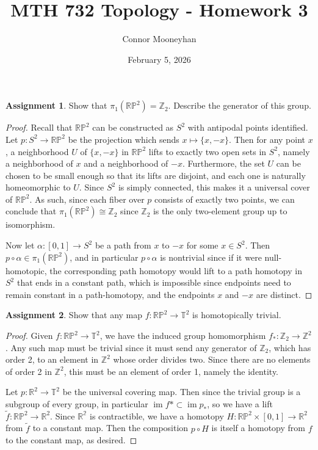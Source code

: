 \documentclass[12pt]{article}
\title{MTH 732 Topology - Homework 3}
\author{Connor Mooneyhan}
\date{February 5, 2026}
\DeclareMathOperator{\im}{im}
\theoremstyle{definition}
\newtheorem{ex}{Assignment}
\begin{document}
\maketitle

\begin{ex}
	Show that $\pi_1(\mathbb{RP}^2) = \mathbb{Z}_2$.
	Describe the generator of this group.
\end{ex}
\begin{proof}
	Recall that $\mathbb{RP}^2$ can be constructed as $S^2$ with antipodal points identified.
	Let $p: S^2 \to \mathbb{RP}^2$ be the projection which sends $x \mapsto \lbrace x, -x \rbrace$.
	Then for any point $x$, a neighborhood $U$ of $\lbrace x, -x \rbrace$ in $\mathbb{RP}^2$ lifts to exactly two open sets in $S^2$, namely a neighborhood of $x$ and a neighborhood of $-x$.
	Furthermore, the set $U$ can be chosen to be small enough so that its lifts are disjoint, and each one is naturally homeomorphic to $U$.
	Since $S^2$ is simply connected, this makes it a universal cover of $\mathbb{RP}^2$.
	As such, since each fiber over $p$ consists of exactly two points, we can conclude that $\pi_1(\mathbb{RP}^2) \cong \mathbb{Z}_2$ since $\mathbb{Z}_2$ is the only two-element group up to isomorphism.

	Now let $\alpha : [0, 1] \to S^2$ be a path from $x$ to $-x$ for some $x \in S^2$.
	Then $p \circ \alpha \in \pi_1(\mathbb{RP}^2)$, and in particular $p \circ \alpha$ is nontrivial since if it were null-homotopic, the corresponding path homotopy would lift to a path homotopy in $S^2$ that ends in a constant path, which is impossible since endpoints need to remain constant in a path-homotopy, and the endpoints $x$ and $-x$ are distinct.
\end{proof}

\begin{ex}
	Show that any map $f : \mathbb{R}\mathbb{P}^2 \to \mathbb{T}^2$ is homotopically trivial.
\end{ex}
\begin{proof}
	Given $f : \mathbb{RP}^2 \to \mathbb{T}^2$, we have the induced group homomorphism $f_* : \mathbb{Z}_2 \to \mathbb{Z}^2$.
	Any such map must be trivial since it must send any generator of $\mathbb{Z}_2$, which has order 2, to an element in $\mathbb{Z}^2$ whose order divides two.
	Since there are no elements of order 2 in $\mathbb{Z}^2$, this must be an element of order 1, namely the identity.

	Let $p : \mathbb{R}^2 \to \mathbb{T}^2$ be the universal covering map.
	Then since the trivial group is a subgroup of every group, in particular $\im f* \subset \im p_*$, so we have a lift $\widetilde{f} : \mathbb{RP}^2 \to \mathbb{R}^2$.
	Since $\mathbb{R^2}$ is contractible, we have a homotopy $H : \mathbb{RP}^2 \times [0, 1] \to \mathbb{R}^2$ from $\widetilde{f}$ to a constant map.
	Then the composition $p \circ H$ is itself a homotopy from $f$ to the constant map, as desired.
\end{proof}
\end{document}
